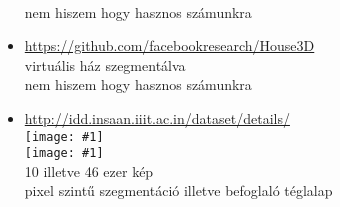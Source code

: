 \documentclass[12pt]{report}
\newcommand{\img}[1]{\texttt{[image: \#1]}}
\begin{document}
\begin{itemize}
	\\nem hiszem hogy hasznos számunkra
	\item \url{https://github.com/facebookresearch/House3D}
	\\virtuális ház szegmentálva
	\\nem hiszem hogy hasznos számunkra
	\item \url{http://idd.insaan.iiit.ac.in/dataset/details/}
	\\\img{18}
	\\\img{19}
	\\10 illetve 46 ezer kép
	\\pixel szintű szegmentáció illetve befoglaló téglalap

	
	
\end{itemize}
\end{document}
